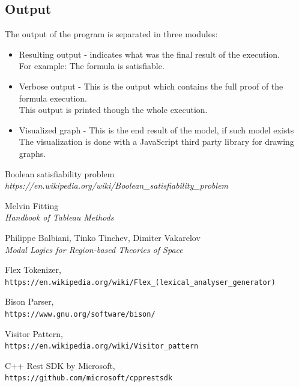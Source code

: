 \documentclass{article}
\begin{document}
		\subsection*{Output}
		The output of the program is separated in three modules:
		\begin{itemize}
			\item Resulting output - indicates what was the final result of the execution. \\
				For example: The formula is satisfiable.
			\item Verbose output - This is the output which contains the full proof of the formula execution. \\
				This output is printed though the whole execution.
			\item Visualized graph - This is the end result of the model, if such model exists \\
				The visualization is done with a JavaScript third party library for drawing graphs.
		\end{itemize}
	\newpage
	\begin{thebibliography}{9}
		Boolean satisfiability problem
		\\\textit{https://en.wikipedia.org/wiki/Boolean\_satisfiability\_problem}

		Melvin Fitting
		\\\textit{Handbook of Tableau Methods}

		Philippe Balbiani, Tinko Tinchev, Dimiter Vakarelov
		\\\textit{Modal Logics for Region-based Theories of Space}

		Flex Tokenizer,
		\\\texttt{https://en.wikipedia.org/wiki/Flex\_(lexical\_analyser\_generator)}

		Bison Parser,
		\\\texttt{https://www.gnu.org/software/bison/}

		Visitor Pattern,
		\\\texttt{https://en.wikipedia.org/wiki/Visitor\_pattern}


		C++ Rest SDK by Microsoft,
		\\\texttt{https://github.com/microsoft/cpprestsdk}

	\end{thebibliography}
\end{document}
